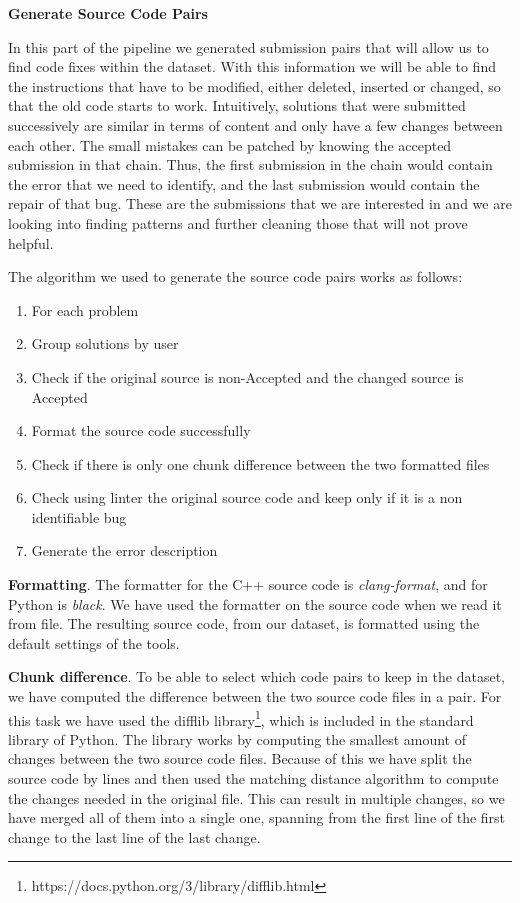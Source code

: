 \documentclass[12pt,a4paper]{report}
\begin{document}
\textbf{Generate Source Code Pairs}

In this part of the pipeline we generated submission pairs that will allow us to find code fixes within the dataset. With this information we will be able to find the instructions that have to be modified, either deleted, inserted or changed, so that the old code starts to work. Intuitively, solutions that were submitted successively are similar in terms of content and only have a few changes between each other. The small mistakes can be patched by knowing the accepted submission in that chain. Thus, the first submission in the chain would contain the error that we need to identify, and the last submission would contain the repair of that bug. These are the submissions that we are interested in and we are looking into finding patterns and further cleaning those that will not prove helpful.

The algorithm we used to generate the source code pairs works as follows:
\begin{enumerate}
\item For each problem
\item Group solutions by user
\item Check if the original source is non-Accepted and the changed source is Accepted
\item Format the source code successfully
\item Check if there is only one chunk difference between the two formatted files
\item Check using linter the original source code and keep only if it is a non identifiable bug
\item Generate the error description
\end{enumerate}

\textbf{Formatting}. The formatter for the C++ source code is \textit{clang-format}, and for Python is \textit{black}. We have used the formatter on the source code when we read it from file. The resulting source code, from our dataset, is formatted using the default settings of the tools.

\textbf{Chunk difference}. To be able to select which code pairs to keep in the dataset, we have computed the difference between the two source code files in a pair. For this task we have used the difflib library\footnote{https://docs.python.org/3/library/difflib.html}, which is included in the standard library of Python. The library works by computing the smallest amount of changes between the two source code files. Because of this we have split the source code by lines and then used the matching distance algorithm to compute the changes needed in the original file. This can result in multiple changes, so we have merged all of them into a single one, spanning from the first line of the first change to the last line of the last change.
\end{document}
